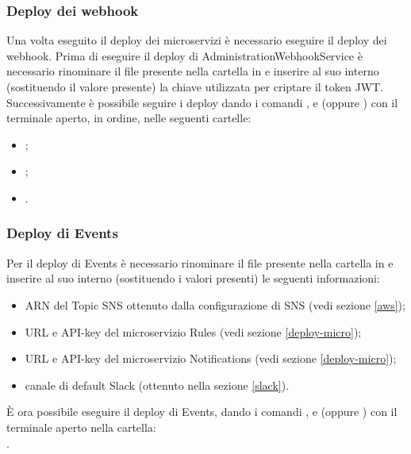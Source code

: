\subsubsection{Deploy dei webhook}
Una volta eseguito il deploy dei microservizi è necessario eseguire il deploy dei webhook. Prima di eseguire il deploy di AdministrationWebhookService è necessario rinominare il file  presente nella cartella  in  e inserire al suo interno (sostituendo il valore presente) la chiave utilizzata per criptare il token JWT. Successivamente è possibile seguire i deploy dando i comandi  ,  e  (oppure ) con il terminale aperto, in ordine, nelle seguenti cartelle:
\begin{itemize}
	\item {};
	\item {};
	\item {}.
\end{itemize}

\subsubsection{Deploy di Events}\label{deploy-events}
Per il deploy di Events è necessario rinominare il file  presente nella cartella  in  e inserire al suo interno (sostituendo i valori presenti) le seguenti informazioni:
\begin{itemize}
	\item ARN del Topic SNS ottenuto dalla configurazione di SNS (vedi sezione \ref{aws});
	\item URL e API-key del microservizio Rules (vedi sezione \ref{deploy-micro});
	\item URL e API-key del microservizio Notifications (vedi sezione \ref{deploy-micro});
	\item canale di default Slack (ottenuto nella sezione \ref{slack}).
\end{itemize}
È ora possibile eseguire il deploy di Events, dando i comandi  ,  e  (oppure ) con il terminale aperto nella cartella: \\ .


